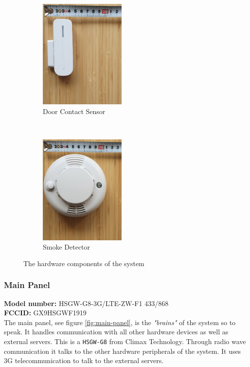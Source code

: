 \begin{figure}[!ht]
    \begin{subfigure}[t]{0.33\textwidth}
        \centering
        \includegraphics[height=2.15in]{images/door-contact.png}
        \caption{Door Contact Sensor}
        \label{fig:door-contact}
    \end{subfigure}%
    ~
    \begin{subfigure}[t]{0.33\textwidth}
        \centering
        \includegraphics[height=2.15in]{images/smoke-detector.png}
        \caption{Smoke Detector}
        \label{fig:smoke-detector}
    \end{subfigure}
    \caption{The hardware components of the system}
    \label{fig:hardware-components}
\end{figure}
\subsubsection{Main Panel}
\textbf{Model number:} HSGW-G8-3G/LTE-ZW-F1 433/868 \\
\textbf{FCCID:} GX9HSGWF1919 \\
The main panel, see figure \ref{fig:main-panel}, is the \textit{"brains"} of the system so to speak. It handles communication with all other hardware devices as well as external servers. This is a \texttt{HSGW-G8} from Climax Technology. Through radio wave communication it talks to the other hardware peripherals of the system. It uses 3G telecommunication to talk to the external servers.

